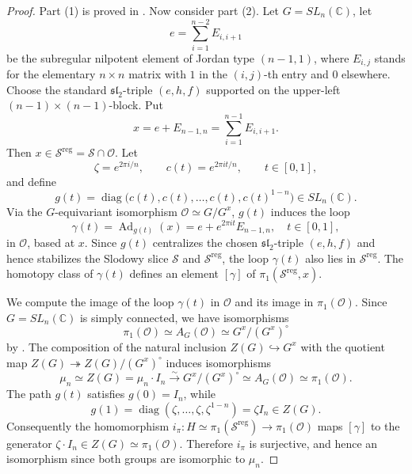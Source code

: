 \documentclass{amsart}
\theoremstyle{definition}
\DeclareMathOperator{\reg}{reg}
\newcommand{\cS}{\mathcal{S}}
\newcommand{\0}{\mathcal{O}}
\begin{document}
	
\begin{proof}
	Part (1) is proved in \cite{Slodowy:book}. Now consider part (2).
	Let $G=SL_n(\mathbb C)$, let
	\[
	e=\sum_{i=1}^{n-2}E_{i,i+1}
	\]
	be the subregular nilpotent element of Jordan type $(n-1,1)$, where $E_{i,j}$ stands for the elementary $n \times n$ matrix with $1$ in the $(i,j)$-th entry and $0$ elsewhere. Choose the standard $\mathfrak{sl}_2$-triple $(e,h,f)$ supported on the upper-left $(n-1)\times(n-1)$-block. Put
	\[
		x=e+E_{n-1,n}=\sum_{i=1}^{n-1}E_{i,i+1}.
	\]
	Then $x \in \cS^{\reg} = \cS \cap \0$.
	Let
	\[
	\zeta=e^{2\pi i/n},\qquad c(t)=e^{2\pi i t/n},\qquad t \in [0,1],
	\]
	and define
	\[
	g(t)=\operatorname{diag}\bigl(c(t),c(t),\ldots,c(t),c(t)^{1-n}\bigr)\in SL_n(\mathbb C).
	\]
	Via the $G$-equivariant isomorphism $\0 \simeq G/G^x$, 
	$g(t)$ induces the loop
	\[
		\gamma(t)=\operatorname{Ad}_{g(t)}(x) = e + e^{2\pi i t}E_{n-1,n}, \quad t \in [0,1],
	\]
	in $\0$, based at $x$.
	Since $g(t)$ centralizes the chosen $\mathfrak{sl}_2$-triple $(e,h,f)$ and hence stabilizes the Slodowy slice $\cS$ and $\cS^{\reg}$, the loop $\gamma(t)$ also lies in $\cS^{\reg}$. 
	The homotopy class of $\gamma(t)$ defines an element $[\gamma]$ of $\pi_1(\cS^{\reg},x)$.
	

	
	We compute the image of the loop $\gamma(t)$ in $\0$ and its image in $\pi_1(\0)$. Since $G=SL_n(\mathbb C)$ is simply connected, we have isomorphisms
		\[ \pi_1(\0) \simeq A_G(\0) \simeq G^x/(G^x)^\circ  \]
	by \cite[Lemma 6.1.1]{C-M}. The composition of the natural inclusion $Z(G) \hookrightarrow G^x$ with the quotient map $Z(G) \twoheadrightarrow Z(G)/(G^x)^\circ$ induces  isomorphisms
		\[ \mu_n \simeq Z(G) = \mu_n \cdot I_n \xrightarrow{\sim} G^x/(G^x)^\circ \simeq A_G(\0) \simeq \pi_1(\0).\]
	The path $g(t)$ satisfies $g(0)=I_n$, while
	\[
	g(1)=\operatorname{diag}(\zeta,\ldots,\zeta,\zeta^{1-n})=\zeta I_n\in Z(G).
	\]
	Consequently the homomorphism $i_\pi: H \simeq \pi_1(\cS^{\reg}) \to \pi_1(\0)$ maps $[\gamma]$ to the generator $\zeta \cdot I_n \in Z(G) \simeq \pi_1(\0)$. Therefore $i_\pi$ is surjective, and hence an isomorphism since both groups are isomorphic to $\mu_n$.


\end{proof}
\end{document}
